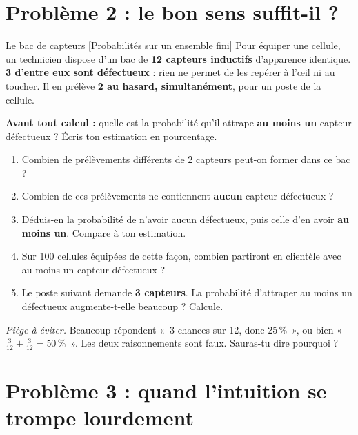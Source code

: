 \documentclass[a4paper,11pt]{article}
\begin{document}
\newpage
\section{Problème 2 : le bon sens suffit-il ?}

\begin{exo}{Le bac de capteurs \hfill \normalfont\color{uimmlightblue}[Probabilités sur un ensemble fini]}
Pour équiper une cellule, un technicien dispose d'un bac de \textbf{12 capteurs inductifs} d'apparence identique. \textbf{3 d'entre eux sont défectueux} : rien ne permet de les repérer à l'{\oe}il ni au toucher. Il en prélève \textbf{2 au hasard, simultanément}, pour un poste de la cellule.

\begin{intuition}
\textbf{Avant tout calcul :} quelle est la probabilité qu'il attrape \textbf{au moins un} capteur défectueux ? Écris ton estimation en pourcentage. \dotfill
\end{intuition}

\begin{enumerate}
  \item Combien de prélèvements différents de 2 capteurs peut-on former dans ce bac ?
  \item Combien de ces prélèvements ne contiennent \textbf{aucun} capteur défectueux ?
  \item Déduis-en la probabilité de n'avoir aucun défectueux, puis celle d'en avoir \textbf{au moins un}. Compare à ton estimation.
  \item Sur 100 cellules équipées de cette façon, combien partiront en clientèle avec au moins un capteur défectueux ?
  \item Le poste suivant demande \textbf{3 capteurs}. La probabilité d'attraper au moins un défectueux augmente-t-elle beaucoup ? Calcule.
\end{enumerate}

\vspace{4pt}
\textit{Piège à éviter.} Beaucoup répondent «~3 chances sur 12, donc 25\,\%~», ou bien «~$\frac{3}{12}+\frac{3}{12}=50\,\%$~». Les deux raisonnements sont faux. Sauras-tu dire pourquoi ?
\end{exo}

\newpage
\section{Problème 3 : quand l'intuition se trompe lourdement}
\end{document}
